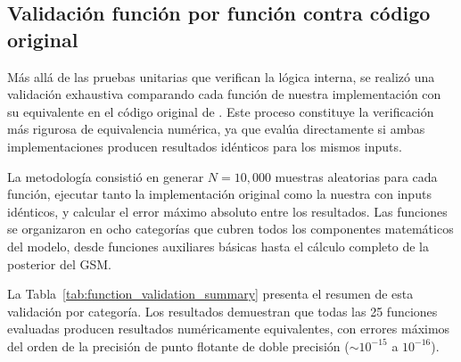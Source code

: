 

\subsection{Validación función por función contra código original}
\label{subsec:res_function_validation}

Más allá de las pruebas unitarias que verifican la lógica interna, se realizó una validación exhaustiva comparando cada función de nuestra implementación con su equivalente en el código original de \citeauthor{echeveste2020cortical}. Este proceso constituye la verificación más rigurosa de equivalencia numérica, ya que evalúa directamente si ambas implementaciones producen resultados idénticos para los mismos inputs.

La metodología consistió en generar $N = 10{,}000$ muestras aleatorias para cada función, ejecutar tanto la implementación original como la nuestra con inputs idénticos, y calcular el error máximo absoluto entre los resultados. Las funciones se organizaron en ocho categorías que cubren todos los componentes matemáticos del modelo, desde funciones auxiliares básicas hasta el cálculo completo de la posterior del \acrshort{GSM}.

La Tabla~\ref{tab:function_validation_summary} presenta el resumen de esta validación por categoría. Los resultados demuestran que todas las 25 funciones evaluadas producen resultados numéricamente equivalentes, con errores máximos del orden de la precisión de punto flotante de doble precisión ($\sim 10^{-15}$ a $10^{-16}$).

